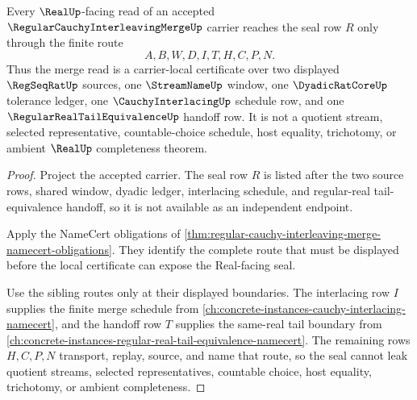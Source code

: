 \begin{theorem}
\label{thm:regular-cauchy-interleaving-merge-real-seal-nonescape}
Every $\RealUp$-facing read of an accepted $\RegularCauchyInterleavingMergeUp$ carrier reaches the seal row $R$ only through the finite route
$$
A,B,W,D,I,T,H,C,P,N .
$$
Thus the merge read is a carrier-local certificate over two displayed $\RegSeqRatUp$ sources, one $\StreamNameUp$ window, one $\DyadicRatCoreUp$ tolerance ledger, one $\CauchyInterlacingUp$ schedule row, and one $\RegularRealTailEquivalenceUp$ handoff row. It is not a quotient stream, selected representative, countable-choice schedule, host equality, trichotomy, or ambient $\RealUp$ completeness theorem.
\end{theorem}
\begin{proof}
Project the accepted carrier. The seal row $R$ is listed after the two source rows, shared window, dyadic ledger, interlacing schedule, and regular-real tail-equivalence handoff, so it is not available as an independent endpoint.

Apply the NameCert obligations of \autoref{thm:regular-cauchy-interleaving-merge-namecert-obligations}. They identify the complete route that must be displayed before the local certificate can expose the Real-facing seal.

Use the sibling routes only at their displayed boundaries. The interlacing row $I$ supplies the finite merge schedule from \autoref{ch:concrete-instances-cauchy-interlacing-namecert}, and the handoff row $T$ supplies the same-real tail boundary from \autoref{ch:concrete-instances-regular-real-tail-equivalence-namecert}. The remaining rows $H,C,P,N$ transport, replay, source, and name that route, so the seal cannot leak quotient streams, selected representatives, countable choice, host equality, trichotomy, or ambient completeness.
\end{proof}



